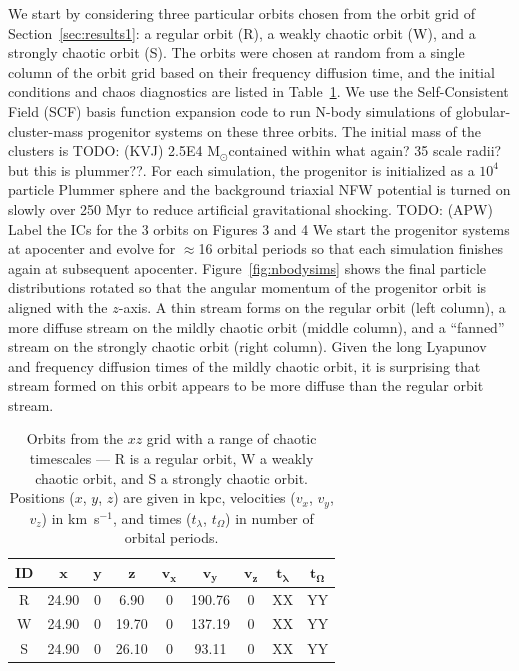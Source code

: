 \documentclass[letterpaper,12pt,preprint]{aastex}
\newcommand{\msun}{\ensuremath{\mathrm{M}_\odot}}
\newcommand{\bs}[1]{\boldsymbol{#1}}
\newcommand{\todo}[2]{{\color{red} TODO: (\MakeUppercase{#1}) #2}}
\begin{document}
We start by considering three particular orbits chosen from the orbit grid of Section~\ref{sec:results1}: a regular orbit (R), a weakly chaotic orbit (W), and a strongly chaotic orbit (S). The orbits were chosen at random from a single column of the orbit grid based on their frequency diffusion time, and the initial conditions and chaos diagnostics are listed in Table~\ref{tbl:three-orbits}. We use the Self-Consistent Field (SCF) basis function expansion code \citep{hernquist92} to run N-body simulations of globular-cluster-mass progenitor systems on these three orbits. The initial mass of the clusters is \todo{kvj}{2.5E4 \msun contained within what again? 35 scale radii? but this is plummer??}. For each simulation, the progenitor is initialized as a $10^4$ particle Plummer sphere and the background triaxial NFW potential is turned on slowly over 250 Myr to reduce artificial gravitational shocking. \todo{apw}{Label the ICs for the 3 orbits on Figures 3 and 4} We start the progenitor systems at apocenter and evolve for $\approx$16 orbital periods so that each simulation finishes again at subsequent apocenter. Figure~\ref{fig:nbodysims} shows the final particle distributions rotated so that the angular momentum of the progenitor orbit is aligned with the $z$-axis. A thin stream forms on the regular orbit (left column), a more diffuse stream on the mildly chaotic orbit (middle column), and a ``fanned'' stream on the strongly chaotic orbit (right column). Given the long Lyapunov and frequency diffusion times of the mildly chaotic orbit, it is surprising that stream formed on this orbit appears to be more diffuse than the regular orbit stream. 

\begin{table}[ht]
\begin{center}
	\begin{tabular}{c | c c c c c c | c c }
		{\bf ID} & $\bs{x}$ & $\bs{y}$ & $\bs{z}$ & $\bs{v_x}$ & $\bs{v_y}$ & $\bs{v_z}$ & $\bs{t_\lambda}$ & $\bs{t_\Omega}$ \\\toprule
		R & 24.90 & 0 & 6.90 & 0 & 190.76 & 0 & XX & YY\\
		\midrule
		W & 24.90 & 0 & 19.70 & 0 & 137.19 & 0 & XX & YY\\
		\midrule
		S & 24.90 & 0 & 26.10 & 0 & 93.11 & 0 & XX & YY\\
		\bottomrule
		\end{tabular}
	\caption{Orbits from the $xz$ grid with a range of chaotic timescales --- R is a regular orbit, W a weakly chaotic orbit, and S a strongly chaotic orbit. Positions ($x$, $y$, $z$) are given in kpc, velocities ($v_x$, $v_y$, $v_z$) in km~s$^{-1}$, and times ($t_\lambda$, $t_\Omega$) in number of orbital periods. \label{tbl:three-orbits}}
\end{center}
\end{table}
\end{document}
